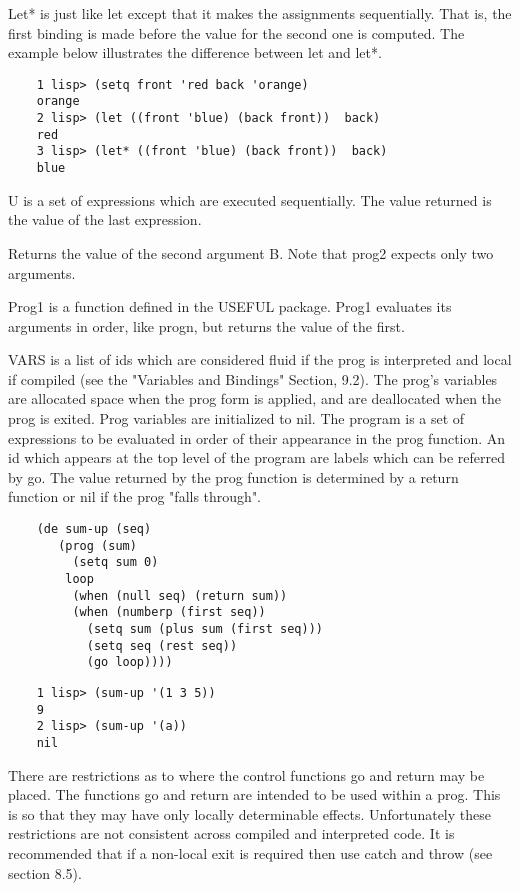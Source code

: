 {    Let*  is  just like let except that it makes the assignments
    sequentially.  That is, the first binding is made before the
    value for the second one is computed.    The  example  below
    illustrates the difference between let and let*.
}
\begin{verbatim}
    1 lisp> (setq front 'red back 'orange)
    orange
    2 lisp> (let ((front 'blue) (back front))  back)
    red
    3 lisp> (let* ((front 'blue) (back front))  back)
    blue
\end{verbatim}

{    U  is a set of  expressions which are executed sequentially.
    The value returned is the value of the last expression.
}

{    Returns the value of the second argument B.  Note that prog2
    expects only two arguments.
}

{    Prog1 is a function defined in the USEFUL  package.    Prog1
    evaluates  its  arguments  in order, like progn, but returns
    the value of the first.
}

{    VARS is a list of ids which are considered fluid if the prog
    is interpreted and local if compiled (see the "Variables and
    Bindings" Section, 9.2).  The prog's variables are allocated
    space when the prog form is  applied,  and  are  deallocated
    when  the prog is exited.  Prog variables are initialized to
    nil.  The program is a set of expressions to be evaluated in
    order of their appearance in the prog function.  An id which
    appears at the top level of the program are labels which can
    be referred by go.  The value returned by the prog  function
    is determined by a return function or nil if the prog "falls
    through".
}
\begin{verbatim}
    (de sum-up (seq)
       (prog (sum)
         (setq sum 0)
        loop
         (when (null seq) (return sum))
         (when (numberp (first seq))
           (setq sum (plus sum (first seq)))
           (setq seq (rest seq))
           (go loop))))
\end{verbatim}
\begin{verbatim}
    1 lisp> (sum-up '(1 3 5))
    9
    2 lisp> (sum-up '(a))
    nil
\end{verbatim}
  There  are  restrictions  as to where the control functions go
and return may be placed.   The  functions  go  and  return  are
intended  to  be  used  within a prog.  This is so that they may
have only locally determinable  effects.    Unfortunately  these
restrictions  are not consistent across compiled and interpreted
code.  It is recommended that if a non-local  exit  is  required
then use catch and throw (see section 8.5).

